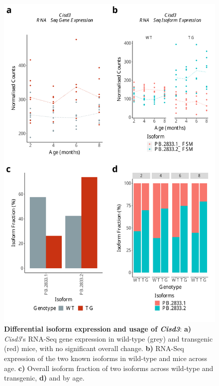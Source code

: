\begin{figure}[htp]
	\begin{center}
		\includegraphics[page=1,scale = 0.55]{Figures/DIU_notDEG_major.pdf}
	\end{center}
	\captionsetup{width=0.95\textwidth}
	\caption[Differential isoform expression and usage of \textit{Cisd3}]%
	{\textbf{Differential isoform expression and usage of \textit{Cisd3}}: \textbf{a)} \textit{Cisd3}'s RNA-Seq gene expression in wild-type (grey) and transgenic (red) mice, with no significant overall change. \textbf{b)} RNA-Seq expression of the two known isoforms in wild-type and mice across age. \textbf{c)} Overall isoform fraction of two isoforms across wild-type and transgenic, \textbf{d)} and by age.}    
	\label{fig:DIU_Cisd3}
\end{figure}


